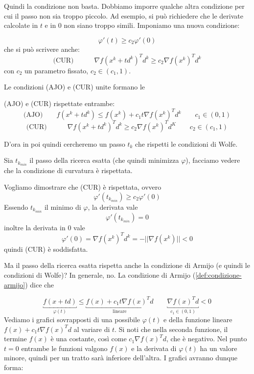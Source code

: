 Quindi la condizione non basta. Dobbiamo imporre qualche altra
condizione per cui il passo non sia troppo piccolo. Ad esempio, si può
richiedere che le derivate calcolate in $t$ e in $0$ non siano troppo
simili. Imponiamo una nuova condizione:
\begin{defn}
\label{def:condizione-curvatura}
$$ \varphi'(t) \geq c_2 \varphi'(0)$$
che si può scrivere anche:
$$  \text{(CUR)} \qquad \quad \nabla f(x^{k} + td^{k})^{T} d^{k} \geq c_2 \nabla f(x^{k})^{T} d^{k}$$
con $c_2$ un parametro fissato, $c_2 \in (c_1, 1)$.
\end{defn}

Le condizioni (AJO) e (CUR) unite formano le
\begin{defn}
\label{defn:condizioni-wolfe} (AJO) e (CUR) rispettate entrambe:
$$  \text{(AJO)} \qquad  f(x^{k}+ td^{k}) \leq  f(x^{k}) + c_1 t \nabla f(x^{k})^{T} d^{k}\qquad c_1\in (0,1)$$
$$  \text{(CUR)} \qquad \quad \nabla f(x^{k} + td^{k})^{T} d^{k} \geq c_2 \nabla f(x^{k})^{T} d^{K} \qquad c_2 \in (c_1, 1)$$
\end{defn}

D'ora in poi quindi cercheremo un passo $t_k$ che rispetti le
condizioni di Wolfe.

\begin{property}
\label{prop:passo-ricerca-esatta-soddisfa-wolfe} Sia $t_{k_{min}}$ il
passo della ricerca esatta (che quindi minimizza $\varphi$), facciamo
vedere che la condizione di curvatura \`e rispettata.
\begin{thproof} Vogliamo dimostrare che (CUR) \`e rispettata, ovvero $$
\varphi'(t_{k_{min}}) \geq c_2 \varphi'(0)$$ Essendo $t_{k_{min}}$ il
minimo di $\varphi$, la derivata vale $$\varphi'(t_{k_{min}}) =0$$
inoltre la derivata in $0$ vale $$\varphi'(0) = \nabla f(x^{k})^{T}
d^{k} = - ||\nabla f(x^{k})|| < 0 $$ quindi (CUR) \`e soddisfatta.
\end{thproof}
\end{property}

Ma il passo della ricerca esatta rispetta anche la condizione di
Armijo (e quindi le condizioni di Wolfe)? In generale, no. La
condizione di Armijo (\ref{def:condizione-armijo}) dice che

$$ \underbracket{f(x + td)}_{\varphi(t)} \leq \underbracket{f(x) + c_1 t \nabla f(x)^{T}d}_{\text{lineare}} \qquad \underbracket{\nabla f(x)^Td}_{c_1 \in (0,1)} < 0$$
Vediamo i grafici sovrapposti di una possibile $\varphi(t)$ e della
funzione lineare $f(x) + c_1 t \nabla f(x)^{T}d$ al variare di $t$. Si
noti che nella seconda funzione, il termine $f(x)$ \`e una costante,
così come $c_1 \nabla f(x)^{T}d$, che \`e negativo. Nel punto $t=0$
entrambe le funzioni valgono $f(x)$ e la derivata di $\varphi(t)$ ha
un valore minore, quindi per un tratto sar\`a inferiore dell'altra. I
grafici avranno dunque forma:

